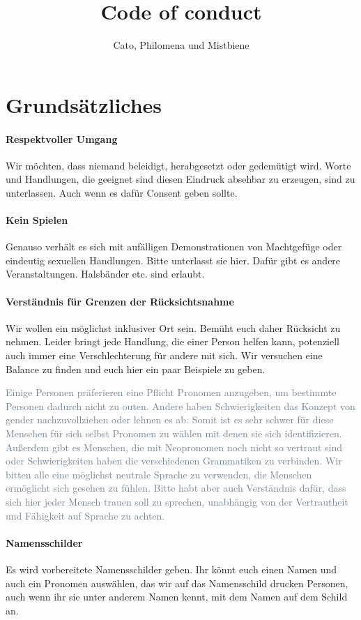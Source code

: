 \documentclass{article}
\title{Code of conduct}
\author{Cato, Philomena und Mistbiene}
\begin{document}
\section{Grundsätzliches}
\paragraph{\textcolor{PastelRed}{Respektvoller Umgang}}
Wir möchten, dass niemand beleidigt, herabgesetzt oder gedemütigt wird. Worte und Handlungen, die geeignet sind diesen Eindruck absehbar zu erzeugen, sind zu unterlassen. Auch wenn es dafür Consent geben sollte. 
\paragraph{\textcolor{PastelRed}{Kein Spielen}}
Genauso verhält es sich mit aufälligen Demonstrationen von Machtgefüge oder eindeutig sexuellen Handlungen. Bitte unterlasst sie hier. Dafür gibt es andere Veranstaltungen. Halsbänder etc. sind erlaubt.
\paragraph{\textcolor{PastelRed}{Verständnis für Grenzen der Rücksichtsnahme}}
Wir wollen ein möglichst inklusiver Ort sein. Bemüht euch daher Rücksicht zu nehmen. Leider bringt jede Handlung, die einer Person helfen kann, potenziell auch immer eine Verschlechterung für andere mit sich. Wir versuchen eine Balance zu finden und euch hier ein paar Beispiele zu geben.

\begingroup{}
\textcolor{SlateGrey}{Einige Personen präferieren eine Pflicht Pronomen anzugeben, um bestimmte Personen dadurch nicht zu outen. Andere haben Schwierigkeiten das Konzept von gender nachzuvollziehen oder lehnen es ab. Somit ist es sehr schwer für diese Menschen für sich selbst Pronomen zu wählen mit denen sie sich identifizieren. Außerdem gibt es Menschen, die mit Neopronomen noch nicht so vertraut sind oder Schwierigkeiten haben die verschiedenen Grammatiken zu verbinden. 
Wir bitten alle eine möglichst neutrale Sprache zu verwenden, die Menschen ermöglicht sich gesehen zu fühlen. Bitte habt aber auch Verständnis dafür, dass sich hier jeder Mensch trauen soll zu sprechen, unabhängig von der Vertrautheit und Fähigkeit auf Sprache zu achten.}

\endgroup
\paragraph{\textcolor{PastelRed}{Namensschilder}}
Es wird vorbereitete Namensschilder geben. Ihr könnt euch einen Namen und auch ein Pronomen auswählen, das wir auf das Namensschild drucken Personen, auch wenn ihr sie unter anderem Namen kennt, mit dem Namen auf dem Schild an.
\end{document}

